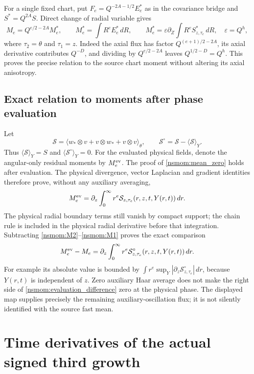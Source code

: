 For a single fixed chart, put
$F_e=Q^{-2A-1/2}E_e^*$ as in the covariance bridge and
$S^*=Q^{2A}S$. Direct change of radial variable gives
\[
 M_e=Q^{e/2-2A}M_e^*,\qquad
 M_e^*=\int R^eE_e^*\,dR,
 \qquad
 M_e^*=\varepsilon\partial_Z\int R^e S^*_{z,\tau_e}\,dR,
 \quad\varepsilon=Q^h,
\]
where $\tau_2=\theta$ and $\tau_1=z$. Indeed the axial flux has
factor $Q^{(e+1)/2-2A}$, its axial derivative contributes $Q^{-D}$,
and dividing by $Q^{e/2-2A}$ leaves $Q^{1/2-D}=Q^h$.
This proves the precise relation to the source chart moment without
altering its axial anisotropy.

\subsection{Exact relation to moments after phase evaluation}
\label{nsmom:evaluated}
Let
\[
 \mathcal S=\langle w_*\otimes v+v\otimes w_*+v\otimes v\rangle_\theta,
 \qquad \mathcal S^\circ=\mathcal S-\langle\mathcal S\rangle_Y.
\]
Thus $\langle\mathcal S\rangle_Y=S$ and
$\langle\mathcal S^\circ\rangle_Y=0$. For the evaluated physical
fields, denote the angular-only residual moments by $M_e^{\rm ev}$.
The proof of \eqref{nsmom:mean_zero} holds after evaluation. The
physical divergence, vector Laplacian and gradient identities therefore
prove, without any auxiliary averaging,
\[
 M_e^{\rm ev}
   =\partial_z\int_0^\infty r^e
        \mathcal S_{z,\tau_e}(r,z,t,Y(r,t))\,dr.
\]
The physical radial boundary terms still vanish by compact support;
the chain rule is included in the physical radial derivative before
that integration. Subtracting \eqref{nsmom:M2}--\eqref{nsmom:M1} proves
the exact comparison
\begin{equation}
 M_e^{\rm ev}-M_e
 =\partial_z\int_0^\infty r^e
     \mathcal S^\circ_{z,\tau_e}(r,z,t,Y(r,t))\,dr.
 \label{nsmom:evaluation_difference}
\end{equation}
For example its absolute value is bounded by
$\int r^e\sup_Y|\partial_z\mathcal S^\circ_{z,\tau_e}|\,dr$,
because $Y(r,t)$ is independent of $z$. Zero auxiliary Haar average
does not make the right side of \eqref{nsmom:evaluation_difference}
zero at the physical phase. The displayed map supplies precisely the
remaining auxiliary-oscillation flux; it is not silently identified
with the source fast mean.


\section{Time derivatives of the actual signed third growth}
\label{tgdc:section}

